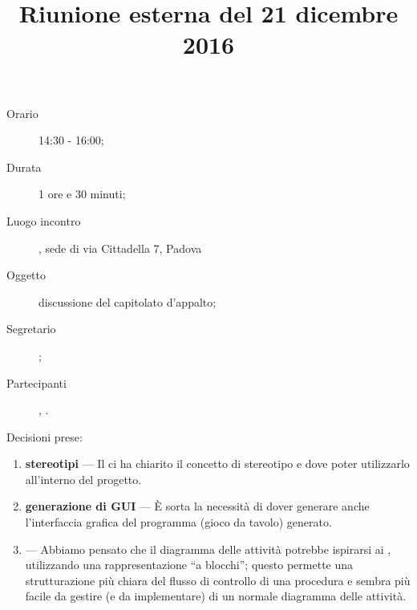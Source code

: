 


\author{\PB}
\supervisor{\MM}
\dest{\ALL}
\title{Riunione esterna del 21 dicembre 2016}



\maketitle

\begin{description}
	\item[Orario] 14:30 - 16:00;
	\item[Durata] 1 ore e 30 minuti;
	\item[Luogo incontro] \ZU, sede di via Cittadella 7, Padova
	\item[Oggetto] discussione del capitolato d'appalto;
	\item[Segretario] \AZ; 
	\item[Partecipanti] \GP, \ALL.
\end{description}

Decisioni prese:
\begin{enumerate}
	\item \textbf{stereotipi} --- Il \GP ci ha chiarito il concetto di stereotipo e dove poter utilizzarlo all'interno del progetto.
	\item \textbf{generazione di GUI} --- È sorta la necessità di dover generare anche l'interfaccia grafica del programma (gioco da tavolo) generato.
	\item \textbf{} ---  Abbiamo pensato che il diagramma delle attività potrebbe ispirarsi ai , utilizzando una rappresentazione “a blocchi”; questo permette una strutturazione più chiara del flusso di controllo di una procedura e sembra più facile da gestire (e da implementare) di un normale diagramma delle attività.
\end{enumerate}


